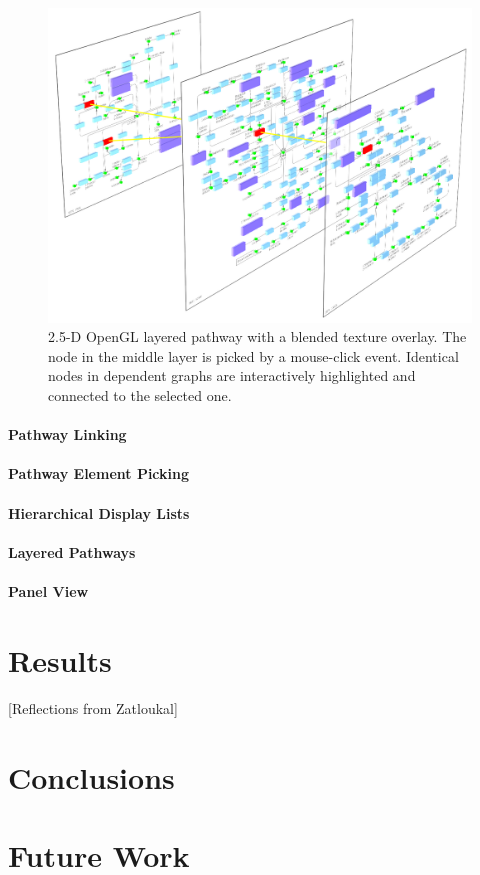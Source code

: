\begin{figure}[ht]
  \centering
    \includegraphics[width=0.7\linewidth]{gfx/opengl_layered_pathway}
  \caption{2.5-D OpenGL layered pathway with a blended texture overlay. The node in the middle layer is picked by a mouse-click event. Identical nodes in dependent graphs are interactively highlighted and connected to the selected one.}
  \label{fig:opengl_layered_pathway}
\end{figure}

\subsubsection{Pathway Linking}


\subsubsection{Pathway Element Picking}


\subsubsection{Hierarchical Display Lists}

\citep{Shreiner2005}

\subsubsection{Layered Pathways}

\subsubsection{Panel View}

\chapter{Results}

[Reflections from Zatloukal]

\chapter{Conclusions}

\chapter{Future Work}



